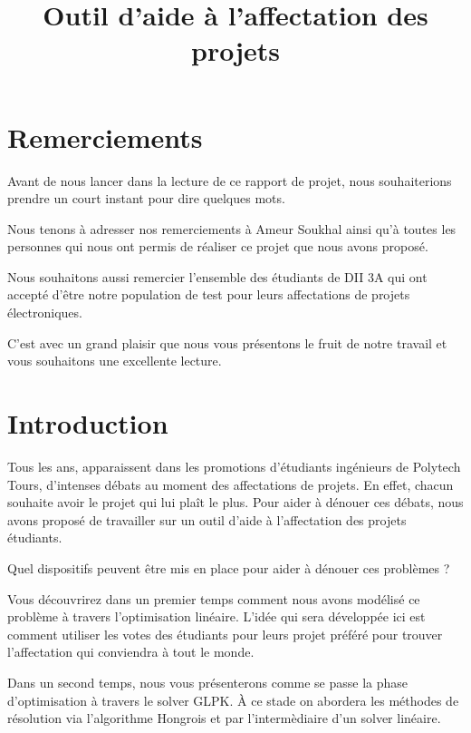 \documentclass[final,poster]{polytech/polytech}
\title{Outil d'aide à l'affectation des projets}
\begin{document}

\chapter*{Remerciements}

Avant de nous lancer dans la lecture de ce rapport de projet, nous souhaiterions prendre un court instant pour dire quelques mots.

Nous tenons à adresser nos remerciements à Ameur Soukhal ainsi qu'à toutes les personnes qui nous ont permis de réaliser ce projet que nous avons proposé.

Nous souhaitons aussi remercier l'ensemble des étudiants de DII 3A qui ont accepté d'être notre population de test pour leurs affectations de projets électroniques. 

C'est avec un grand plaisir que nous vous présentons le fruit de notre travail et vous souhaitons une excellente lecture.

\chapter*{Introduction\label{chap:intro}}


Tous les ans, 	apparaissent dans les promotions d'étudiants ingénieurs de Polytech Tours, d'intenses débats au moment des affectations de projets. 
En effet, chacun souhaite avoir le projet qui lui plaît le plus. Pour aider à dénouer ces débats, nous avons proposé de travailler sur un outil d'aide à l'affectation des projets étudiants. 

Quel dispositifs peuvent être mis en place pour aider à dénouer ces problèmes ?



Vous découvrirez dans un premier temps comment nous avons modélisé ce problème à travers l'optimisation linéaire. L'idée qui sera développée ici est comment utiliser les votes des étudiants pour leurs projet préféré pour trouver l'affectation qui conviendra à tout le monde.

Dans un second temps, nous vous présenterons comme se passe la phase d'optimisation à travers le solver GLPK. \`A ce stade on abordera les méthodes de résolution via l'algorithme Hongrois et par l'intermèdiaire d'un solver linéaire.
\end{document}
